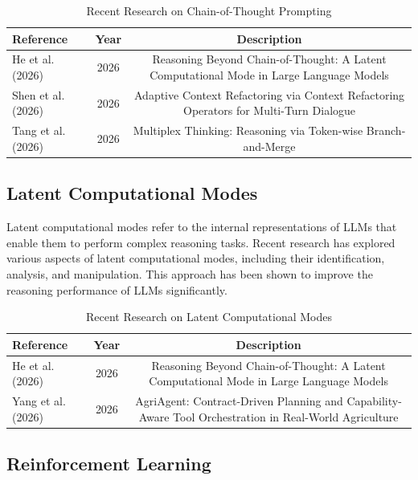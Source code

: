 \documentclass{article}
\begin{document}
\begin{table}[H]
\centering
\begin{tabular}{|l|c|c|}
\hline
\textbf{Reference} & \textbf{Year} & \textbf{Description} \\
\hline
He et al. (2026) & 2026 & Reasoning Beyond Chain-of-Thought: A Latent Computational Mode in Large Language Models \\
\hline
Shen et al. (2026) & 2026 & Adaptive Context Refactoring via Context Refactoring Operators for Multi-Turn Dialogue \\
\hline
Tang et al. (2026) & 2026 & Multiplex Thinking: Reasoning via Token-wise Branch-and-Merge \\
\hline
\end{tabular}
\caption{Recent Research on Chain-of-Thought Prompting}
\label{tab:CoT}
\end{table}

\subsection{Latent Computational Modes}

Latent computational modes refer to the internal representations of LLMs that enable them to perform complex reasoning tasks. Recent research has explored various aspects of latent computational modes, including their identification, analysis, and manipulation. This approach has been shown to improve the reasoning performance of LLMs significantly.

\begin{table}[H]
\centering
\begin{tabular}{|l|c|c|}
\hline
\textbf{Reference} & \textbf{Year} & \textbf{Description} \\
\hline
He et al. (2026) & 2026 & Reasoning Beyond Chain-of-Thought: A Latent Computational Mode in Large Language Models \\
\hline
Yang et al. (2026) & 2026 & AgriAgent: Contract-Driven Planning and Capability-Aware Tool Orchestration in Real-World Agriculture \\
\hline
\end{tabular}
\caption{Recent Research on Latent Computational Modes}
\label{tab:Latent}
\end{table}

\subsection{Reinforcement Learning}
\end{document}
